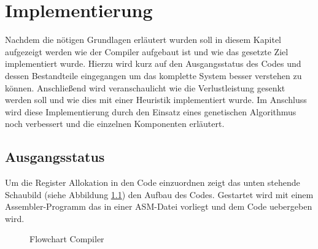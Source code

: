 \chapter{Implementierung}
\label{chap:Implementierung}
Nachdem die nötigen Grundlagen erläutert wurden soll in diesem Kapitel aufgezeigt werden wie der Compiler aufgebaut ist und wie das gesetzte Ziel implementiert wurde. Hierzu wird kurz auf den Ausgangsstatus des Codes und dessen Bestandteile eingegangen um das komplette System besser verstehen zu können. Anschließend wird veranschaulicht wie die Verlustleistung gesenkt werden soll und wie dies mit einer Heuristik implementiert wurde. Im Anschluss wird diese Implementierung durch den Einsatz eines genetischen Algorithmus noch verbessert und die einzelnen Komponenten erläutert.
\section{Ausgangsstatus}
Um die Register Allokation in den Code einzuordnen zeigt das unten stehende Schaubild (siehe Abbildung \ref{fig:flow_compiler}) den Aufbau des Codes. Gestartet wird mit einem Assembler-Programm das in einer ASM-Datei vorliegt und dem Code uebergeben wird.


\begin{scriptsize}
	\begin{figure}[htbp] 
		\centering
		
		\caption{Flowchart Compiler}
		\label{fig:flow_compiler}
	\end{figure}
\end{scriptsize}

